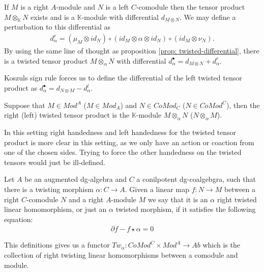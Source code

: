 \documentclass[../thesis.tex]{subfiles}
\begin{document}
            If $M$ is a right $A$-module and $N$ is a left $C$-comodule then the tensor product $M\otimes_\mathbb{K} N$ exists and is a $\mathbb{K}$-module with differential $d_{M\otimes N}$. We may define a perturbation to this differential as 
            \begin{align*}
                d_\alpha^r = (\mu_M\otimes id_N) \circ (id_M \otimes \alpha \otimes id_N) \circ (id_M \otimes \nu_N).
            \end{align*}
            By using the same line of thought as proposition \ref{prop: twisted-differential}, there is a twisted tensor product $M\otimes_\alpha N$ with differential $d_\alpha^\bullet = d_{M\otimes N} + d_\alpha^r$.

            \begin{remark}
                Koszuls sign rule forces us to define the differential of the left twisted tensor product as $d_\alpha^\bullet = d_{N\otimes M} - d_\alpha^l$. 
            \end{remark}
            
            \begin{definition}
                Suppose that $M\in Mod^A$ ($M\in Mod_A$) and $N\in CoMod_C$ ($N\in CoMod^C$), then the right (left) twisted tensor product is the $\mathbb{K}$-module $M\otimes_\alpha N$ ($N\otimes_\alpha M$).
            \end{definition}

            In this setting right handedness and left handedness for the twisted tensor product is more clear in this setting, as we only have an action or coaction from one of the chosen sides. Trying to force the other handedness on the twisted tensors would just be ill-defined.

            \begin{definition}
                Let $A$ be an augmented dg-algebra and $C$ a conilpotent dg-coalgebgra, such that there is a twisting morphism $\alpha: C\rightarrow A$. Given a linear map $f: N \rightarrow M$ between a right $C$-comodule $N$ and a right $A$-module $M$ we say that it is an $\alpha$ right twisted linear homomorphism, or just an  $\alpha$ twisted morphism, if it satisfies the following equation:
                \begin{align*}
                    \partial f - f\star \alpha = 0
                \end{align*} 
            \end{definition}

            This definitions gives us a functor $Tw_\alpha : CoMod^C \times Mod^A \rightarrow Ab$ which is the collection of right twisting linear homomorphisms between a comodule and module.
\end{document}
